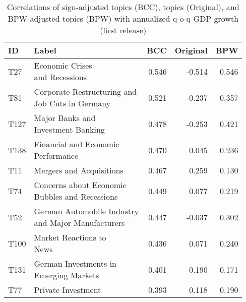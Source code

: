 \begin{table}[!h]
\centering
\caption{Correlations of sign-adjusted topics (BCC), topics (Original), and BPW-adjusted topics (BPW) with annualized q-o-q GDP growth (first release) \label{tab:cor_gdp_different_approaches}}
\centering
\begin{tabular}[t]{llrrr}
\toprule
ID & Label & BCC & Original & BPW\\
\midrule
T27 & \makecell[tl]{ Economic Crises \\ and Recessions} & 0.546 & -0.514 & 0.546\\
T81 & \makecell[tl]{ Corporate Restructuring and \\ Job Cuts in Germany} & 0.521 & -0.237 & 0.357\\
T127 & \makecell[tl]{ Major Banks and \\ Investment Banking} & 0.478 & -0.253 & 0.421\\
T138 & \makecell[tl]{ Financial and Economic \\ Performance} & 0.470 & 0.045 & 0.236\\
T11 & Mergers and Acquisitions & 0.467 & 0.259 & 0.130\\
\addlinespace
T74 & \makecell[tl]{ Concerns about Economic\\ Bubbles and Recessions} & 0.449 & 0.077 & 0.219\\
T52 & \makecell[tl]{ German Automobile Industry \\ and Major Manufacturers} & 0.447 & -0.037 & 0.302\\
T100 & \makecell[tl]{ Market Reactions to \\News} & 0.436 & 0.071 & 0.240\\
T131 & \makecell[tl]{German Investments in \\ Emerging Markets} & 0.401 & 0.190 & 0.171\\
T77 & Private Investment & 0.393 & 0.118 & 0.190\\
\bottomrule
\end{tabular}
\end{table}
